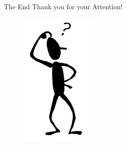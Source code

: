 \documentclass[hyperref={pdfpagelabels=false}]{beamer}
\begin{document}
\begin{frame}{The End}
\centering
\LARGE
\color{red}
 Thank you for your Attention!
 \nocite{BeamerTheme}
\end{frame}

\begin{frame}
\centering
\begin{figure}
	\includegraphics{who.png}
\end{figure}
\end{frame}
\end{document}
